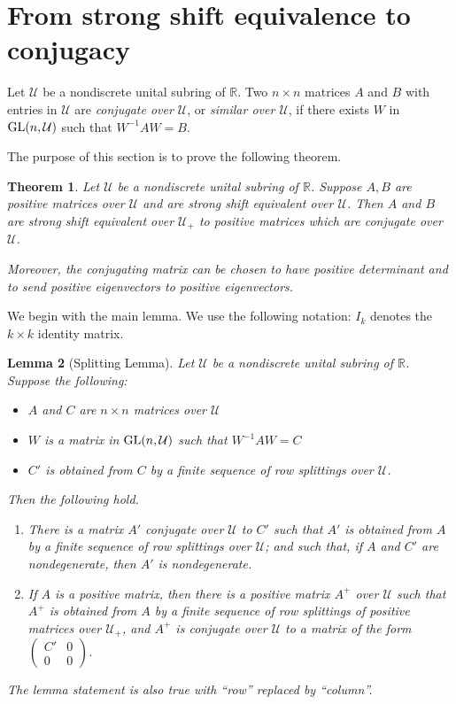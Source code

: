 \documentclass{amsart}
\newtheorem{theorem}{Theorem}[section]
\newtheorem{lemma}[theorem]{Lemma}
\theoremstyle{definition}
\theoremstyle{remark}
\numberwithin{equation}{section}
\begin{document}
{\section {From strong shift equivalence to conjugacy} \label{fromsse}

 Let $\mathcal U$ be a nondiscrete unital subring of 
$\mathbb R$. Two $n\times n$ matrices   $A$ and $B$ 
with entries in 
$\mathcal U$ are {\it  conjugate over $\mathcal U$}, 
or {\it similar over $\mathcal U$}, if there 
exists $W$ in $\textnormal{GL}(n,\mathcal U)$ such that 
$W^{-1}AW =B$. 

The purpose of this section is to prove 
the following theorem. 

\begin{theorem} \label{ssetosim} 
Let $\mathcal U$ be 
a nondiscrete unital subring 
of $\mathbb{R}$. Suppose 
 $A,B$ are positive matrices over $\mathcal U$ 
and are strong shift equivalent over $\mathcal U$. 
Then $A$ and $ B$ are 
strong shift equivalent over $\mathcal U_+$ to positive matrices 
which are conjugate  over $\mathcal U$.

Moreover, the conjugating matrix can be chosen
to have positive determinant and to send positive 
eigenvectors to positive eigenvectors.
\end{theorem} 

We begin with the main lemma. We use the following notation: 
$I_k$ denotes the $k\times k$ identity matrix. 

\begin{lemma}[Splitting Lemma]
\label{positivitysplittinglemma}
Let  $\mathcal U$ be a nondiscrete unital subring of 
$\mathbb R$.  
Suppose the following: 
\begin{itemize} 
\item 
$A$ and $C$ are $n\times n$ matrices over $\mathcal U$
\item 
$W$ is a matrix in $\textnormal{GL}(n,\mathcal U)$ such that  
$W^{-1}AW=C $
\item 
$C'$ is obtained from $C$ by a finite sequence of 
  row 
splittings over $\mathcal U$. 
\end{itemize} 
Then the following hold. 
\begin{enumerate} 
\item 
There is a matrix $A'$ conjugate  over $\mathcal U$ 
to $C'$ such that $A'$ is obtained from $A$
by a finite sequence 
of row splittings  over $\mathcal U$; 
and such that,  if $A$ and 
$C'$ are nondegenerate,  
then  $A'$ is nondegenerate. 
\item 
If $A$ is a positive matrix, then there is a 
positive matrix $A^+$ over $\mathcal U$ 
such that $A^+$ is obtained 
 from $A$ by a finite sequence 
of row splittings of positive matrices over 
$\mathcal U_+$, and $A^+$ is conjugate over 
$\mathcal U$ to a matrix of the form 
$\left(\begin{smallmatrix} C' & 0 \\ 0& 0 
\end{smallmatrix}\right)$.  
\end{enumerate} 
The lemma statement is also true with ``row'' replaced by 
``column''. 
\end{lemma} 
 
}
\end{document}
